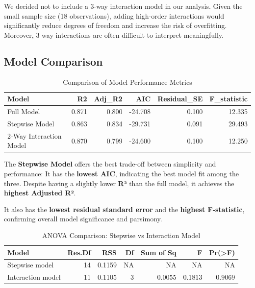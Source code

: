 \documentclass[
  11pt,
]{article}
\begin{document}
We decided not to include a 3-way interaction model in our analysis.
Given the small sample size (18 observations), adding high-order
interactions would significantly reduce degrees of freedom and increase
the risk of overfitting. Moreover, 3-way interactions are often
difficult to interpret meaningfully.

\subsection{Model Comparison}\label{model-comparison}

\begingroup\fontsize{8}{10}\selectfont

\begin{longtable}[t]{lrrrrr}
\caption{\label{tab:unnamed-chunk-17}Comparison of Model Performance Metrics}\\
\toprule
Model & R2 & Adj\_R2 & AIC & Residual\_SE & F\_statistic\\
\midrule
Full Model & 0.871 & 0.800 & -24.708 & 0.100 & 12.335\\
Stepwise Model & 0.863 & 0.834 & -29.731 & 0.091 & 29.493\\
2-Way Interaction Model & 0.870 & 0.799 & -24.600 & 0.100 & 12.250\\
\bottomrule
\end{longtable}
\endgroup{}

The \textbf{Stepwise Model} offers the best trade-off between simplicity
and performance: It has the \textbf{lowest AIC}, indicating the best
model fit among the three. Despite having a slightly lower \textbf{R²}
than the full model, it achieves the \textbf{highest Adjusted R²}.

It also has the \textbf{lowest residual standard error} and the
\textbf{highest F-statistic}, confirming overall model significance and
parsimony.

\begin{table}[!h]
\centering
\caption{\label{tab:unnamed-chunk-18}ANOVA Comparison: Stepwise vs Interaction Model}
\centering
\fontsize{8}{10}\selectfont
\begin{tabular}[t]{lrrrrrr}
\toprule
Model & Res.Df & RSS & Df & Sum of Sq & F & Pr(>F)\\
\midrule
Stepwise model & 14 & 0.1159 & NA & NA & NA & NA\\
Interaction model & 11 & 0.1105 & 3 & 0.0055 & 0.1813 & 0.9069\\
\bottomrule
\end{tabular}
\end{table}
\end{document}
